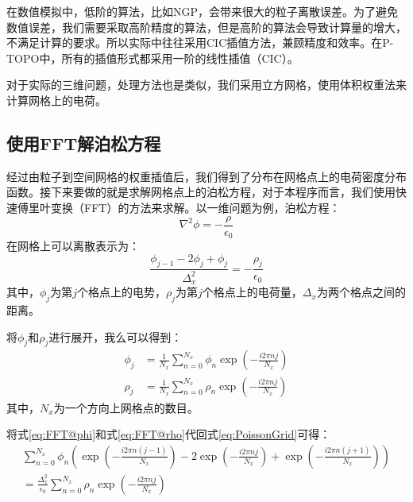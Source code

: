 {在数值模拟中，低阶的算法，比如NGP，会带来很大的粒子离散误差。为了避免数值误差，我们需要采取高阶精度的算法，但是高阶的算法会导致计算量的增大，不满足计算的要求。所以实际中往往采用CIC插值方法，兼顾精度和效率。在P-TOPO中，所有的插值形式都采用一阶的线性插值（CIC）。

对于实际的三维问题，处理方法也是类似，我们采用立方网格，使用体积权重法来计算网格上的电荷。

\subsection{使用FFT解泊松方程}
\label{section:PIC_FFT}
经过由粒子到空间网格的权重插值后，我们得到了分布在网格点上的电荷密度分布函数。接下来要做的就是求解网格点上的泊松方程，对于本程序而言，我们使用快速傅里叶变换（FFT）的方法来求解。以一维问题为例，泊松方程：
\begin{equation}\label{eq:Poisson}
\nabla^2 \phi = -\frac{\rho}{\epsilon _0}
\end{equation}
在网格上可以离散表示为：
\begin{equation}\label{eq:PoissonGrid}
\frac{\phi_{j-1}-2\phi_{j}+\phi_{j}}{\Delta _{x}^{2}}=-\frac{\rho _j}{\epsilon _0}
\end{equation}
其中，$\phi_{j}$为第$j$个格点上的电势，$\rho_{j}$为第$j$个格点上的电荷量，$\Delta _{x}$为两个格点之间的距离。

将$\phi_{j}$和$\rho_{j}$进行展开，我么可以得到：
\begin{align}
\label{eq:FFT@phi}
\phi _j &= \frac{1}{N_x} \sum_{n=0}^{N_x}{\phi_n \exp{(-\frac{i2 \pi n j}{N_x} )}} \\
\label{eq:FFT@rho}
\rho _j &= \frac{1}{N_x} \sum_{n=0}^{N_x}{\rho_n \exp{(-\frac{i2 \pi n j}{N_x} )}}
\end{align}
其中，$N_x$为一个方向上网格点的数目。

将式\ref{eq:FFT@phi}和式\ref{eq:FFT@rho}代回式\ref{eq:PoissonGrid}可得：
\begin{equation}\label{eq:FFT@PIC2}
\begin{aligned}
\sum_{n=0}^{N_x}{\phi_n
\left(\exp{(-\frac{i2 \pi n (j-1)}{N_x} )}  -2\exp{(-\frac{i2 \pi n j}{N_x} )}  +  \exp{(-\frac{i2 \pi n (j+1)}{N_x} )}\right)} \\
= \frac{\Delta _{x}^{2}}{\epsilon _0} \sum_{n=0}^{N_x}{\rho_n \exp{(-\frac{i2 \pi n j}{N_x} )}} \qquad\qquad\qquad
\end{aligned}
\end{equation}

}
